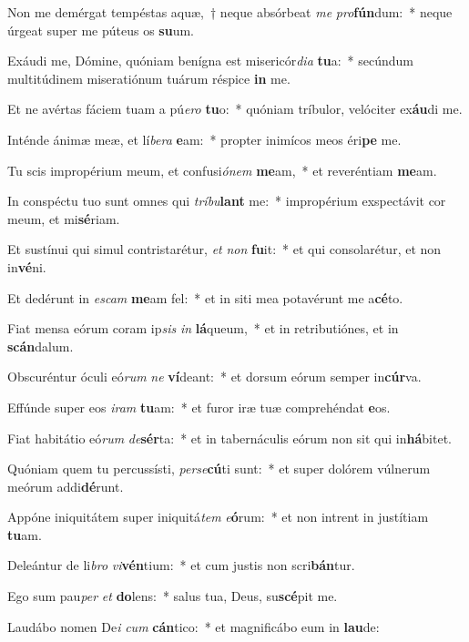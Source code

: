 \item Non me demérgat tempéstas aquæ,~† neque absórbeat \textit{me} \textit{pro}\textbf{fún}dum:~* neque úrgeat super me púteus os \textbf{su}um.
\item Exáudi me, Dómine, quóniam benígna est misericór\textit{di}\textit{a} \textbf{tu}a:~* secúndum multitúdinem miseratiónum tuárum réspice \textbf{in} me.
\item Et ne avértas fáciem tuam a pú\textit{e}\textit{ro} \textbf{tu}o:~* quóniam tríbulor, velóciter ex\textbf{áu}di me.
\item Inténde ánimæ meæ, et lí\textit{be}\textit{ra} \textbf{e}am:~* propter inimícos meos éri\textbf{pe} me.
\item Tu scis impropérium meum, et confusi\textit{ó}\textit{nem} \textbf{me}am,~* et reveréntiam \textbf{me}am.
\item In conspéctu tuo sunt omnes qui \textit{trí}\textit{bu}\textbf{lant} me:~* impropérium exspectávit cor meum, et mi\textbf{sé}riam.
\item Et sustínui qui simul contristarétur, \textit{et} \textit{non} \textbf{fu}it:~* et qui consolarétur, et non in\textbf{vé}ni.
\item Et dedérunt in \textit{es}\textit{cam} \textbf{me}am fel:~* et in siti mea potavérunt me a\textbf{cé}to.
\item Fiat mensa eórum coram ip\textit{sis} \textit{in} \textbf{lá}queum,~* et in retributiónes, et in \textbf{scán}dalum.
\item Obscuréntur óculi eó\textit{rum} \textit{ne} \textbf{ví}deant:~* et dorsum eórum semper in\textbf{cúr}va.
\item Effúnde super eos \textit{i}\textit{ram} \textbf{tu}am:~* et furor iræ tuæ comprehéndat \textbf{e}os.
\item Fiat habitátio eó\textit{rum} \textit{de}\textbf{sér}ta:~* et in tabernáculis eórum non sit qui in\textbf{há}bitet.
\item Quóniam quem tu percussísti, \textit{per}\textit{se}\textbf{cú}ti sunt:~* et super dolórem vúlnerum meórum addi\textbf{dé}runt.
\item Appóne iniquitátem super iniquitá\textit{tem} \textit{e}\textbf{ó}rum:~* et non intrent in justítiam \textbf{tu}am.
\item Deleántur de li\textit{bro} \textit{vi}\textbf{vén}tium:~* et cum justis non scri\textbf{bán}tur.
\item Ego sum pau\textit{per} \textit{et} \textbf{do}lens:~* salus tua, Deus, su\textbf{scé}pit me.
\item Laudábo nomen De\textit{i} \textit{cum} \textbf{cán}tico:~* et magnificábo eum in \textbf{lau}de:
